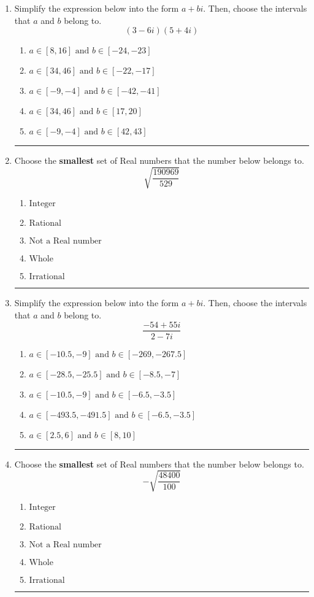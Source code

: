 \documentclass[14pt]{extbook}
\newcommand{\litem}[1]{\item#1\hspace*{-1cm}\rule{\textwidth}{0.4pt}}
\begin{document}
\begin{enumerate}
{\begin{enumerate}[label=\Alph*.]
\end{enumerate} }
\litem{
Simplify the expression below into the form $a+bi$. Then, choose the intervals that $a$ and $b$ belong to.\[ (3 - 6 i)(5 + 4 i) \]\begin{enumerate}[label=\Alph*.]
\item \( a \in [8, 16] \text{ and } b \in [-24, -23] \)
\item \( a \in [34, 46] \text{ and } b \in [-22, -17] \)
\item \( a \in [-9, -4] \text{ and } b \in [-42, -41] \)
\item \( a \in [34, 46] \text{ and } b \in [17, 20] \)
\item \( a \in [-9, -4] \text{ and } b \in [42, 43] \)

\end{enumerate} }
\litem{
Choose the \textbf{smallest} set of Real numbers that the number below belongs to.\[ \sqrt{\frac{190969}{529}} \]\begin{enumerate}[label=\Alph*.]
\item \( \text{Integer} \)
\item \( \text{Rational} \)
\item \( \text{Not a Real number} \)
\item \( \text{Whole} \)
\item \( \text{Irrational} \)

\end{enumerate} }
\litem{
Simplify the expression below into the form $a+bi$. Then, choose the intervals that $a$ and $b$ belong to.\[ \frac{-54 + 55 i}{2 - 7 i} \]\begin{enumerate}[label=\Alph*.]
\item \( a \in [-10.5, -9] \text{ and } b \in [-269, -267.5] \)
\item \( a \in [-28.5, -25.5] \text{ and } b \in [-8.5, -7] \)
\item \( a \in [-10.5, -9] \text{ and } b \in [-6.5, -3.5] \)
\item \( a \in [-493.5, -491.5] \text{ and } b \in [-6.5, -3.5] \)
\item \( a \in [2.5, 6] \text{ and } b \in [8, 10] \)

\end{enumerate} }
\litem{
Choose the \textbf{smallest} set of Real numbers that the number below belongs to.\[ -\sqrt{\frac{48400}{100}} \]\begin{enumerate}[label=\Alph*.]
\item \( \text{Integer} \)
\item \( \text{Rational} \)
\item \( \text{Not a Real number} \)
\item \( \text{Whole} \)
\item \( \text{Irrational} \)


\end{enumerate}}
\end{enumerate}
\end{document}
